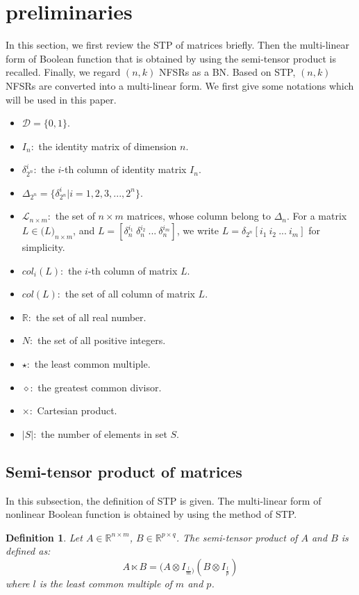 \documentclass[conference]{IEEEtran}
\newtheorem{definition}{Definition}
\begin{document}
\section{preliminaries}
In this section, we first review the STP of matrices briefly. Then the multi-linear
form of Boolean function that is obtained by using the semi-tensor product is recalled. Finally, we regard $(n,k)$ NFSRs as a BN. Based on STP, $(n,k)$ NFSRs are converted into a multi-linear form. We first give some notations which will be used in this paper.
\begin{itemize}
  \item $\mathcal{D}=\{0,1\}$.
  \item $I_n:$ the identity matrix of dimension $n$.
  \item $\delta^i_{2^n}:$ the $i$-th column of identity matrix $I_n$.
  \item $\Delta_{2^n}=\{\delta^i_{2^n}|i=1,2,3,...,2^n\}$.
  \item $\mathcal{L}_{n\times m}:$ the set of $n\times m$ matrices, whose column belong to $\Delta_{n}$. For a matrix $L\in\mathcal(L)_{n\times m}$, and $L=[\delta^{i_1}_{n}~ \delta^{i_2}_{n}~ ... ~ \delta^{i_m}_{n}]$, we write $L=\delta_{2^n}[i_1~ i_2~ ... ~ i_m]$ for simplicity. \item $col_i(L):$ the $i$-th column of matrix $L$.
  \item $col(L):$ the set of all column of matrix $L$.
  \item $\mathbb{R}:$ the set of all real number.
  \item $N:$ the set of all positive integers.
  \item $\star:$ the least common multiple.
  \item $\diamond:$ the greatest common divisor.
  \item $\times:$ Cartesian product.
  \item $|S|:$ the number of elements in set $S$.
\end{itemize}


\subsection{Semi-tensor product of matrices}
In this subsection, the definition of STP is given. The multi-linear form of nonlinear Boolean function is obtained by using the method of STP.

\begin{definition}\label{stp}\cite{Cheng2011Analysis}
Let $A\in\mathbb{R}^{n\times m}$, $B\in \mathbb{R}^{p\times q}$. The \textit{semi-tensor product} of $A$ and $B$ is defined as:
\begin{equation}
A\ltimes B=(A\otimes I_{\frac{l}{m})}(B\otimes I_{\frac{l}{p}})
\end{equation}
where $l$ is the least common multiple of $m$ and $p$.
\end{definition}
\end{document}
